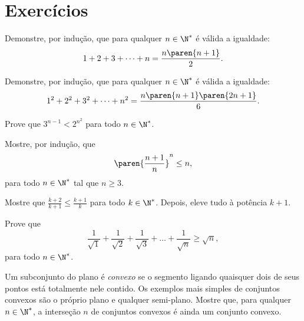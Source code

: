 \section{Exercícios}

\begin{exercise}
Demonstre, por indução, que para qualquer $n \in \N^\ast$ é válida a igualdade:
$$1+2+ 3+ \dots + n = \frac{n \paren {n+1}} 2.$$
\end{exercise}

\begin{exercise}
Demonstre, por indução, que para qualquer $n \in \N^\ast$ é
válida a igualdade:
$$1^2 +2^2 + 3^2+ \dots + n^2 = \frac{n \paren {n+1} \paren{2n+1}} 6.$$
\end{exercise}

\begin{exercise}
Prove que $3^{n-1} < 2^{n^2}$ para todo $n \in \N^\ast$.
\end{exercise}

\begin{exercise}
Mostre, por indução, que
$$\paren{\frac {n+1}{n}}^n \leq n,$$
para todo $n \in \N^\ast$ tal que $n \geq 3$.

\dica Mostre que $\frac{k+2}{k+1} \leq \frac{k+1} k$ para todo $k \in
\N^\ast$. Depois, eleve tudo à potência $k+1$.
\end{exercise}

\begin{exercise}
Prove que
$$\frac 1 {\sqrt 1} +\frac 1 {\sqrt 2} +\frac 1 {\sqrt 3} + \dots + \frac 1 {\sqrt n} \geq \sqrt n,$$
para todo $ n \in \N^\ast$.
\end{exercise}

\begin{exercise}
Um subconjunto do plano é \emph{convexo} se o segmento ligando quaisquer dois de seus pontos está totalmente nele contido.
Os exemplos mais simples de conjuntos convexos são o próprio plano e qualquer semi-plano.
Mostre que, para qualquer $n \in \N^\ast$, a interseção $n$ de conjuntos convexos é ainda um conjunto convexo.
\end{exercise}